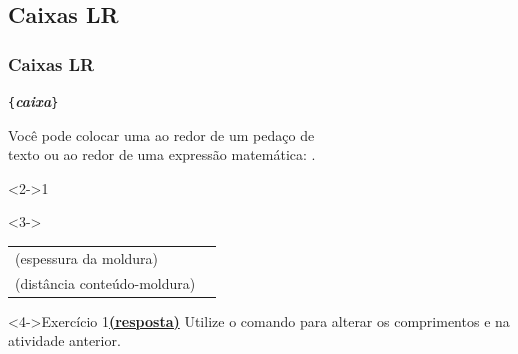 \documentclass[handout,10pt]{beamer}
\begin{document}
\subsection{Caixas LR}
\begin{frame}[fragile]
	\frametitle{Caixas LR}
	
	\centering
	
	\begin{block}{}
		\centering
		\verb|{|\textit{\textbf{caixa}}\verb|}|
	\end{block}
		
	\medskip
		
	Você pode colocar uma  ao redor	de um pedaço de\\ texto ou ao
	redor de uma expressão matemática: .
		
	\vfill

	\begin{atividade}<2->{1}
		\begin{LaTeXcode}			
		\end{LaTeXcode}
	\end{atividade}
		
	\vfill
	
	\begin{uncoverenv}<3->
		\begin{tabularx}{\textwidth}{Xc}
			\cs{fboxrule} {\scriptsize(espessura da moldura)} &
				{\setlength{\fboxrule}{0.5mm}\fbox{\textit{texto}}} \\
			\rule{0pt}{\baselineskip}\cs{fboxsep} {\scriptsize(distância conteúdo-moldura)} & 
				{\setlength{\fboxsep}{0.5mm}\fbox{\textit{texto}}}
		\end{tabularx}
	\end{uncoverenv}
	
	\vfill
	
	\begin{block}<4->{Exercício 1\hyperlink{respostas}{\footnotesize\textbf{(resposta)}}}
		Utilize o comando  para alterar os comprimentos 
		 e  na atividade anterior.
	\end{block}		
			
\end{frame}
\end{document}
